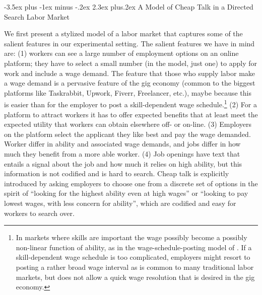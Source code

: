 \documentclass[12pt]{article}
\makeatletter
\renewcommand{\section}{%
  \@startsection{section}{1}{\z@}%
  {-3.5ex plus -1ex minus -.2ex}%
  {2.3ex plus.2ex}%
  {\normalfont\Large\bfseries}%
}
\makeatother
\begin{document}
\section{A Model of Cheap Talk in a Directed Search Labor Market} \label{sec:theory}

We first present a stylized model of a labor market that captures some of the salient features in our experimental setting. The salient features we have in mind are: (1) workers can see a large number of employment options on an online platform; they have to select a small number (in the model, just one) to apply for work and include a wage demand. The feature that those who supply labor make a wage demand is a pervasive feature of the gig economy (common to the biggest platforms like Taskrabbit, Upwork, Fiverr, Freelancer, etc.), maybe because this is easier than for the employer to post a skill-dependent wage schedule.\footnote{In markets where skills are important the wage possibly become a possibly non-linear function of ability, as in the wage-schedule-posting model of \cite{shimer_2005}. If a skill-dependent wage schedule is too complicated, employers might resort to posting a rather broad wage interval as is common to many traditional labor markets, but does not allow a quick wage resolution that is desired in the gig economy.} (2) For a platform to attract workers it has to offer expected benefits that at least meet the expected utility that workers can obtain elsewhere off- or on-line. (3) Employers on the platform select the applicant they like best and pay the wage demanded.
Worker differ in ability and associated wage demands, and jobs differ in how much they benefit from a more able worker.
(4) Job openings have text that entails a signal about the job and how much it relies on high ability, but this information is not codified and is hard to search. Cheap talk is explicitly introduced by asking employers to choose one from a discrete set of options in the spirit of ``looking for the highest ability even at high wages'' or ``looking to pay lowest wages, with less concern for ability'', which are codified and easy for workers to search over. 
\end{document}

